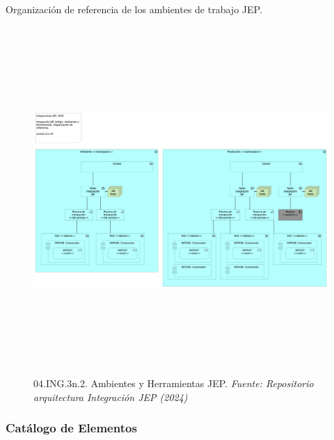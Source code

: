 \documentclass[
  paper=a4,
  ,captions=tableheading
]{scrartcl}
\begin{document}
Organización de referencia de los ambientes de trabajo JEP.

\begin{figure}
\centering
\includegraphics[width=\textwidth,height=5.20833in]{images/04.ING.3n.2.AmbientesyHerramientasJEP.png}
\caption{04.ING.3n.2. Ambientes y Herramientas JEP. \emph{Fuente:
Repositorio arquitectura Integración JEP
(2024)}}\label{fig:id-53af0cb1d4e145a6b82764f7ce8f9237}
\end{figure}

\subsubsection{Catálogo de
Elementos}\label{sec:catuxe1logo-de-elementos-4}
\end{document}
